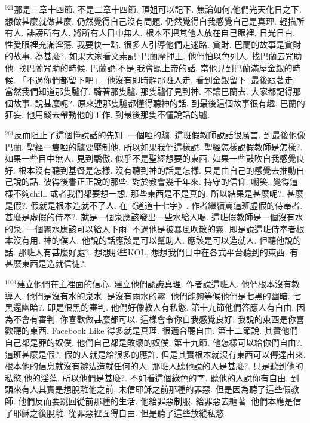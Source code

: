 \documentclass{book}
\begin{document}
$^{921}$那是三章十四節.
不是二章十四節.
頂姐可以記下.
無論如何,他們光天化日之下.
想做甚麼就做甚麼.
仍然覺得自己沒有問題.
仍然覺得自我感覺自己是真理.
輕描所有人.
誹謗所有人.
將所有人目中無人.
根本不把其他人放在自己眼裡.
日光日白.
性愛眼裡充滿淫蕩.
我要快一點.
很多人引導他們走迷路.
貪財.
巴蘭的故事是貪財的故事.
為甚麼?.
如果大家看文素記.
巴蘭摩押王.
他們怕以色列人.
找巴蘭去咒助他.
找巴蘭咒助的時候.
巴蘭說:不是,我會聽上帝的話.
當他見到巴蘭滿屋金銀的時候.
「不過你們都留下吧」.
他沒有即時趕那班人走.
看到金銀留下.
最後跟著走.
當然我們知道那隻驢仔.
騎著那隻驢.
那隻驢仔見到神.
不讓巴蘭去.
大家都記得那個故事.
說甚麼呢?.
原來連那隻驢都懂得聽神的話.
到最後這個故事很有趣.
巴蘭的狂妄.
他用錢去帶動他的工作.
到最後那隻不懂說話的驢.

$^{961}$反而阻止了這個懂說話的先知.
一個啞的驢.
這班假教師說話很厲害.
到最後他像巴蘭.
聖經一隻啞的驢要壓制他.
所以如果我們這樣說.
聖經怎樣說假教師是怎樣?.
如果一些目中無人.
見到驕傲.
似乎不是聖經想要的東西.
如果一些鼓吹自我感覺良好.
根本沒有聽到基督是怎樣.
沒有聽到神的話是怎樣.
只是由自己的感覺去推動自己說的話.
彼得後書正正說的那些.
對於教會幾千年來.
持守的信仰.
嘲笑.
覺得這樣不夠chill.
或者我們都要想一想.
那些東西是不是真的.
所以結果是甚麼呢?.
甚麼是假?.
假就是根本造就不了人.
在《道道十七字》.
作者繼續罵這班虛假的侍奉者.
甚麼是虛假的侍奉?.
就是一個泉應該發出一些水給人喝.
這班假教師是一個沒有水的泉.
一個霧水應該可以給人下雨.
不過他是被暴風吹散的霧.
即是說這班侍奉者根本沒有用.
神的僕人.
他說的話應該是可以幫助人.
應該是可以造就人.
但聽他說的話.
那班人有甚麼好處?.
想想那些KOL.
想想我們日中在各式平台聽到的東西.
有甚麼東西是造就信徒?.

$^{1001}$建立他們在主裡面的信心.
建立他們認識真理.
作者說這班人.
他們根本沒有教導人.
他們是沒有水的泉水.
是沒有雨水的霧.
他們能夠等候他們是七黑的幽暗.
七黑還幽暗?.
即是很黑的審判.
他們好像教人有私慾.
第十九節他們答應人有自由.
因為不會有審判.
你喜歡做甚麼都可以.
這樣會令你自我感覺良好.
我說的東西是你喜歡聽的東西.
Facebook Like 得多就是真理.
很適合聽自由.
第十二節說.
其實他們自己都是罪的奴僕.
他們自己都是敗壞的奴僕.
第十九節.
他怎樣可以給你們自由?.
這班甚麼是假?.
假的人就是給很多的應許.
但是其實根本就沒有東西可以傳達出來.
根本他的信息就沒有辦法造就任何的人.
那班人聽他說的人是甚麼?.
只是聽到他的私慾,他的淫蕩.
所以他們是甚麼?.
不如看這個綠色的字.
聽他的人說你有自由.
到頭來有人其實是想脫離他之前.
未信耶穌之前那種的罪惡.
但是因為聽了這些假教師.
他們反而要跳回從前那種的生活.
他給罪惡制服.
給罪惡去纏著.
他們本應是信了耶穌之後脫離.
從罪惡裡面得自由.
但是聽了這些放縱私慾.
\end{document}
